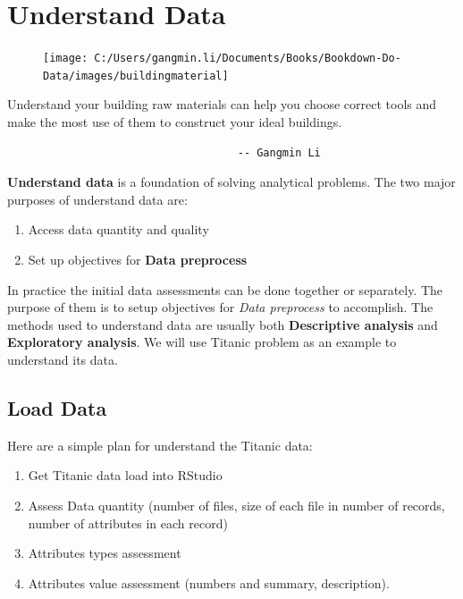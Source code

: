 \documentclass[
]{book}
\providecommand{\tightlist}{%
  \setlength{\itemsep}{0pt}\setlength{\parskip}{0pt}}
\renewenvironment{quote}{\begin{VF}}{\end{VF}}
\begin{document}
\hypertarget{understand-data}{%
\chapter{Understand Data}\label{understand-data}}

\begin{figure}

{\centering \texttt{[image: C:/Users/gangmin.li/Documents/Books/Bookdown-Do-Data/images/buildingmaterial]} 

}

\end{figure}

\begin{quote}
Understand your building raw materials can help you
choose correct tools and make the most use of them to
construct your ideal buildings.

\begin{verbatim}
                                    -- Gangmin Li
\end{verbatim}
\end{quote}

\textbf{Understand data} is a foundation of solving analytical problems. The two major purposes of understand data are:

\begin{enumerate}
\def\labelenumi{\arabic{enumi}.}
\tightlist
\item
  Access data quantity and quality
\item
  Set up objectives for \textbf{Data preprocess}
\end{enumerate}

In practice the initial data assessments can be done together or separately. The purpose of them is to setup objectives for \emph{Data preprocess} to accomplish. The methods used to understand data are usually both \textbf{Descriptive analysis} and \textbf{Exploratory analysis}. We will use Titanic problem as an example to understand its data.

\hypertarget{load-data}{%
\section{Load Data}\label{load-data}}

Here are a simple plan for understand the Titanic data:

\begin{enumerate}
\def\labelenumi{\arabic{enumi}.}
\tightlist
\item
  Get Titanic data load into RStudio
\item
  Assess Data quantity (number of files, size of each file in number of records, number of attributes in each record)
\item
  Attributes types assessment
\item
  Attributes value assessment (numbers and summary, description).
\end{enumerate}
\end{document}
